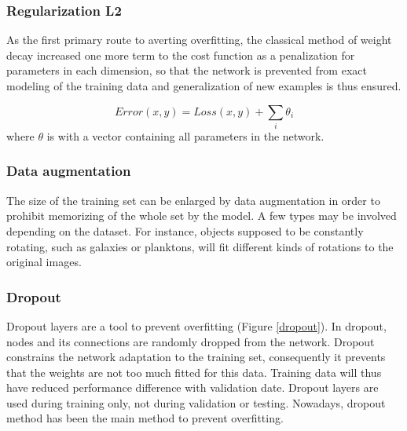     \subsubsection{Regularization L2}
     As the first primary route to averting overfitting, the classical method of weight decay increased one more term to the cost function as a penalization for parameters in each dimension, so that the network is prevented from exact modeling of the training data and generalization of new examples is thus ensured. 

    \begin{equation}
        Error(x, y) =  Loss(x, y) + \sum_{i}\theta_i
    \end{equation}
    where $\theta$ is with a vector containing all parameters in the network.

    \subsubsection{Data augmentation}
    The size of the training set can be enlarged by data augmentation in order to prohibit memorizing of the whole set by the model. A few types may be involved depending on the dataset. For instance, objects supposed to be constantly rotating,  such as galaxies or planktons, will fit different kinds of rotations to the original images.

    \subsubsection{Dropout}
    Dropout layers\cite{srivastava2014dropout} are a tool to prevent overfitting (Figure \ref{dropout}). In dropout, nodes and its connections are randomly dropped from the network. Dropout constrains the network adaptation to the training set, consequently it prevents that the weights are not too much fitted for this data. Training data will thus have reduced performance difference with validation date. Dropout layers are used during training only, not during validation or testing. Nowadays, dropout method has been the main method to prevent overfitting.

